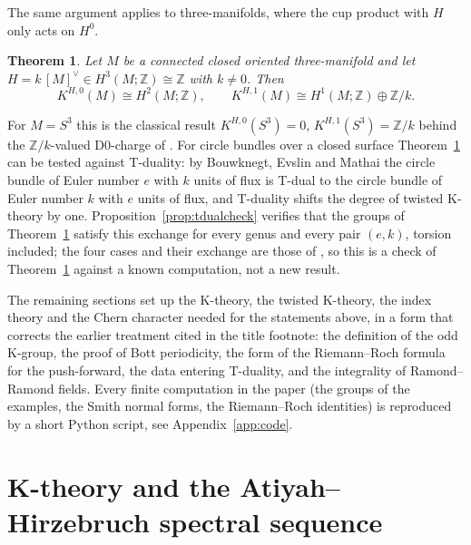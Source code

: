 \documentclass[reqno,11pt]{amsart}
\newtheorem{theorem}{Theorem}[section]
\theoremstyle{definition}
\newcommand{\ZZ}{\mathbb{Z}}
\begin{document}
The same argument applies to three-manifolds, where the cup product with $H$ only acts on $H^0$.

\begin{theorem}\label{thm:three}
Let $M$ be a connected closed oriented three-manifold and let $H=k\,[M]^\vee\in H^3(M;\ZZ)\cong\ZZ$ with $k\neq0$. Then
\[
K^{H,0}(M)\cong H^2(M;\ZZ),\qquad K^{H,1}(M)\cong H^1(M;\ZZ)\oplus\ZZ/k .
\]
\end{theorem}

For $M=S^3$ this is the classical result $K^{H,0}(S^3)=0$, $K^{H,1}(S^3)=\ZZ/k$ behind the $\ZZ/k$-valued D0-charge of \cite{MMS01}. For circle bundles over a closed surface Theorem~\ref{thm:three} can be tested against T-duality: by Bouwknegt, Evslin and Mathai \cite{BEM04a,BEM04b} the circle bundle of Euler number $e$ with $k$ units of flux is T-dual to the circle bundle of Euler number $k$ with $e$ units of flux, and T-duality shifts the degree of twisted K-theory by one. Proposition~\ref{prop:tdualcheck} verifies that the groups of Theorem~\ref{thm:three} satisfy this exchange for every genus and every pair $(e,k)$, torsion included; the four cases and their exchange are those of \cite[Section~4.2]{BEM04a}, so this is a check of Theorem~\ref{thm:three} against a known computation, not a new result.

The remaining sections set up the K-theory, the twisted K-theory, the index theory and the Chern character needed for the statements above, in a form that corrects the earlier treatment cited in the title footnote: the definition of the odd K-group, the proof of Bott periodicity, the form of the Riemann--Roch formula for the push-forward, the data entering T-duality, and the integrality of Ramond--Ramond fields. Every finite computation in the paper (the groups of the examples, the Smith normal forms, the Riemann--Roch identities) is reproduced by a short Python script, see Appendix~\ref{app:code}.

\section{K-theory and the Atiyah--Hirzebruch spectral sequence}\label{sec:ktheory}
\end{document}

